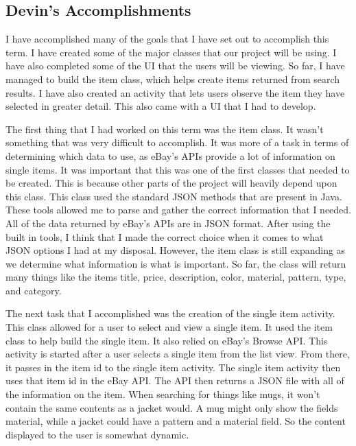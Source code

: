 \documentclass[journal,compsoc, 10pt, draftclsnofoot, onecolumn]{IEEEtran}
\begin{document}
\subsection{Devin's Accomplishments}
I have accomplished many of the goals that I have set out to accomplish this 
term. I have created some of the major classes that our project will be using. 
I have also completed some of the UI that the users will be viewing. So far, 
I have managed to build the item class, which helps create items returned from 
search results. I have also created an activity that lets users observe the 
item they have selected in greater detail. This also came with a UI that I had 
to develop.\newline

The first thing that I had worked on this term was the item class. It wasn't 
something that was very difficult to accomplish. It was more of a task in terms 
of determining which data to use, as eBay's APIs provide a lot of information 
on single items. It was important that this was one of the first classes that 
needed to be created. This is because other parts of the project will heavily 
depend upon this class. This class used the standard JSON methods that are 
present in Java. These tools allowed me to parse and gather the correct 
information that I needed. All of the data returned by eBay's APIs are in 
JSON format. After using the built in tools, I think that I made the correct 
choice when it comes to what JSON options I had at my disposal. However, the 
item class is still expanding as we determine what information is what is 
important. So far, the class will return many things like the items title, 
price, description, color, material, pattern, type, and category. \newline

The next task that I accomplished was the creation of the single item activity. 
This class allowed for a user to select and view a single item. It used the item 
class to help build the single item. It also relied on eBay's Browse API. This 
activity is started after a user selects a single item from the list view. From 
there, it passes in the item id to the single item activity. The single item 
activity then uses that item id in the eBay API. The API then returns a JSON file 
with all of the information on the item. When searching for things like mugs, it 
won't contain the same contents as a jacket would. A mug might only show the 
fields material, while a jacket could have a pattern and a material field. 
So the content displayed to the user is somewhat dynamic. \newline
\end{document}
